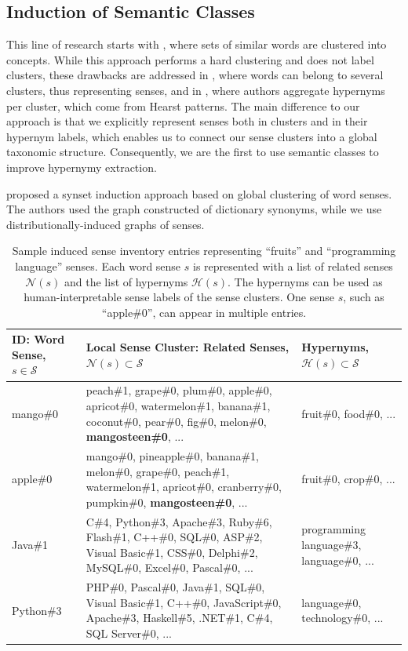 \documentclass[10pt, a4paper]{article}
\begin{document}
\subsection{Induction of Semantic Classes}
This line of research starts with \cite{Lin2001}, where sets of similar words are clustered into concepts. While this approach performs a hard clustering and does not label clusters, these drawbacks are addressed in \cite{Pantel2002}, where words can belong to several clusters, thus representing senses, and in \cite{Pantel2004}, where authors aggregate hypernyms per cluster, which come from Hearst patterns. The main difference to our approach is that we explicitly represent senses both in clusters and in their hypernym labels, which enables us to connect our sense clusters into a global taxonomic structure. Consequently, we are the first to use semantic classes to improve hypernymy extraction. 

 proposed a synset induction approach based on global clustering of word senses. The authors used the graph constructed of dictionary synonyms, while we use distributionally-induced graphs of senses.






\begin{table}
\centering
\footnotesize
\begin{tabular}{l|p{9cm}|p{3.5cm}} 
\bf ID: Word Sense, $s \in \mathcal{S}$ & \bf  Local Sense Cluster: Related Senses, $\mathcal{N}(s) \subset \mathcal{S}$ & \bf   Hypernyms, $\mathcal{H}(s) \subset \mathcal{S}$ \\
\toprule
 mango\#0 &  peach\#1, grape\#0, plum\#0, apple\#0, apricot\#0, watermelon\#1, banana\#1, coconut\#0, pear\#0, fig\#0, melon\#0,  \textbf{mangosteen\#0}, ... & fruit\#0, food\#0, ... \\
 
\midrule
apple\#0 & mango\#0, pineapple\#0, banana\#1, melon\#0, grape\#0, peach\#1, watermelon\#1, apricot\#0, cranberry\#0, pumpkin\#0, \textbf{mangosteen\#0}, ... & fruit\#0, crop\#0,  ... \\

\midrule
Java\#1 & C\#4, Python\#3, Apache\#3, Ruby\#6, Flash\#1, C++\#0, SQL\#0, ASP\#2, Visual Basic\#1, CSS\#0, Delphi\#2, MySQL\#0, Excel\#0, Pascal\#0, ... & programming language\#3, language\#0, ... \\

\midrule
Python\#3 & PHP\#0, Pascal\#0, Java\#1, SQL\#0, Visual Basic\#1, C++\#0, JavaScript\#0, Apache\#3, Haskell\#5, .NET\#1, C\#4, SQL Server\#0, ... & language\#0, technology\#0, ... \\

\end{tabular}
\caption{
Sample induced sense inventory entries  representing ``fruits'' and ``programming language'' senses. Each word sense $s$ is represented with a list of related senses $\mathcal{N}(s)$ and the list of hypernyms $\mathcal{H}(s)$. The hypernyms can be used as human-interpretable sense labels of the sense clusters. One sense $s$, such as ``apple\#0'', can appear in multiple entries.
}
\label{tab:pcz}
\end{table}
\end{document}
